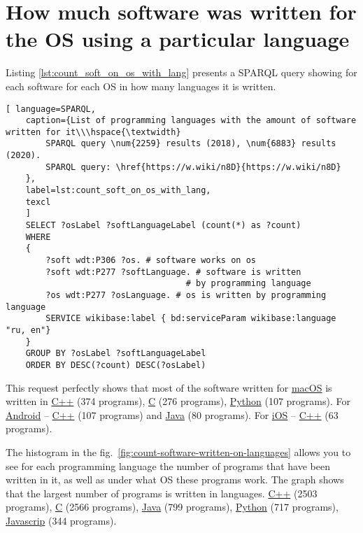 \section{How much software was written for the OS using a particular language}
Listing \ref{lst:count_soft_on_os_with_lang} presents a SPARQL query showing for each software for each OS in how many languages it is written.

\begin{lstlisting}[ language=SPARQL, 
	caption={List of programming languages with the amount of software written for it\\\hspace{\textwidth}
		SPARQL query \num{2259} results (2018), \num{6883} results (2020).
		SPARQL query: \href{https://w.wiki/n8D}{https://w.wiki/n8D}
	},
	label=lst:count_soft_on_os_with_lang,
	texcl 
	]
	SELECT ?osLabel ?softLanguageLabel (count(*) as ?count)
	WHERE
	{
		?soft wdt:P306 ?os. # software works on os
		?soft wdt:P277 ?softLanguage. # software is written 
									# by programming language
		?os wdt:P277 ?osLanguage. # os is written by programming language
		SERVICE wikibase:label { bd:serviceParam wikibase:language "ru, en"}
	}
	GROUP BY ?osLabel ?softLanguageLabel
	ORDER BY DESC(?count) DESC(?osLabel)
\end{lstlisting}

This request perfectly shows that most of the software written for \href{https://www.wikidata.org/wiki/Q14116}{macOS} is written in \href{https://www.wikidata.org/wiki/Q2407}{C++} (374 programs), \href{https://www.wikidata.org/wiki/Q15777}{C} (276 programs), \href{https://www.wikidata.org/wiki/Q28865}{Python} (107 programs).
For \href{https://www.wikidata.org/wiki/Q94}{Android} -- \href{https://www.wikidata.org/wiki/Q2407}{C++} (107 programs) and \href{https://www.wikidata.org/wiki/Q251}{Java} (80 programs).
For \href{https://www.wikidata.org/wiki/Q48493}{iOS} -- \href{https://www.wikidata.org/wiki/Q2407}{C++} (63 programs).


The histogram in the fig.~\ref{fig:count-software-written-on-languages} allows you to see for each programming language the number of programs that have been written in it, as well as under what OS these programs work. The graph shows that the largest number of programs is written in languages. \href{https://www.wikidata.org/wiki/Q2407}{C++} (2503 programs), 
\href{https://www.wikidata.org/wiki/Q15777}{C} (2566 programs), 
\href{https://www.wikidata.org/wiki/Q251}{Java} (799 programs),
\href{https://www.wikidata.org/wiki/Q28865}{Python} (717 programs),
\href{https://www.wikidata.org/wiki/Q2005}{Javascrip} (344 programs).


